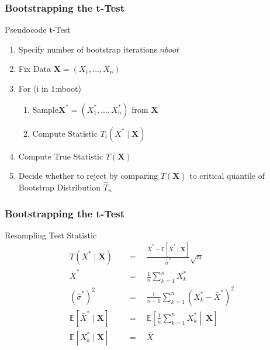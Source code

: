 \documentclass[9pt, dvipsnames]{beamer} %
\begin{document}
    \begin{frame}
    	\frametitle{\textbf{Bootstrapping the t-Test}}
    		\begin{block}{Pseudocode t-Test}
    			\begin{enumerate}
    				\item Specify number of bootstrap iterations $nboot$
    				\item Fix Data $\mathbf{X} = (X_1, ..., X_n)$
    				\item For (i in 1:nboot)
    				\begin{enumerate}
    					\item Sample$\mathbf{X^{*}} = (X_1^{*}, ..., X_n^{*})$ from $\mathbf{X}$
    					\item Compute Statistic $T_i(X^{*} \mid \mathbf{X})$
    				\end{enumerate}
    				\item Compute True Statistic $T(\mathbf{X})$
    				\item Decide whether to reject by comparing $T(\mathbf{X})$ to critical quantile of Bootstrap Distribution $\hat{T}_n$
    			\end{enumerate}
    		\end{block}
    \end{frame}
    \begin{frame}
    	\frametitle{\textbf{Bootstrapping the t-Test}}
    		\begin{alertblock}{Resampling Test Statistic}
				\begin{align*}
					T(X^{*} \mid \mathbf{X}) \quad &= \quad \frac{\bar{X}^{*} - \mathbb{E}[\bar{X}^{*} \mid \mathbf{X}]}{\hat{\sigma}^{*}} \sqrt{n} \\
					\bar{X}^{*} \quad &= \quad \frac{1}{n} \sum_{k=1}^n X_k^{*} \\
					(\hat{\sigma}^{*})^2 \quad &= \quad \frac{1}{n-1} \sum_{k=1}^n (X_k^{*} - \bar{X}^{*})^2 \\
					\mathbb{E}[\bar{X}^{*} \mid \mathbf{X}] \quad &= \quad \mathbb{E}\left[\frac{1}{n} \sum_{k=1}^n X_k^{*} \middle|\ \mathbf{X}\right] \\
					\mathbb{E}[X_k^{*} \mid \mathbf{X}] \quad &= \quad \bar{X}
				\end{align*}
    		\end{alertblock}
    \end{frame}
\end{document}

